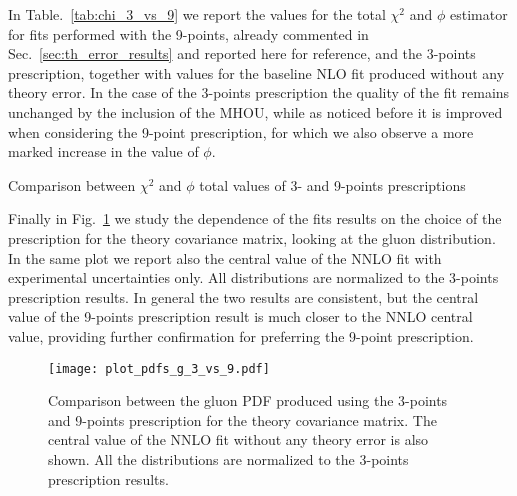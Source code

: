 In Table.~\ref{tab:chi_3_vs_9} we report the values for the total $\chi^2$ and $\phi$ estimator for fits performed with the 9-points,
already commented in Sec.~\ref{sec:th_error_results} and reported here for reference, and the 3-points
prescription, together with values for the baseline NLO fit produced without any theory error.
In the case of the 3-points prescription the quality of the fit remains unchanged by the inclusion of the MHOU,
while as noticed before it is improved when considering the 9-point prescription, for which we also observe a more 
marked increase in the value of $\phi$.

\begin{table}[ht!]
	\centering
	\small
	
        \vspace{3mm}
	\caption{Comparison between $\chi^2$ and $\phi$ total values of 3- and 9-points prescriptions}
	\label{tab:chi_3_vs_9}
\end{table}

Finally in Fig.~\ref{fig:pdfs_plots_th_err_3_vs_9} we study the dependence of the fits results on the choice of the prescription
for the theory covariance matrix, looking at the gluon distribution. In the same plot we report also the central value of
the NNLO fit with experimental uncertainties only. All distributions are normalized to the 3-points prescription results.
In general the two results are consistent, but the central value of the 9-points prescription result is much closer 
to the NNLO central value, providing further confirmation for preferring the 9-point prescription.

\begin{figure}[t!]
    \begin{center}
        \texttt{[image: plot\_pdfs\_g\_3\_vs\_9.pdf]}
        \caption{Comparison between the gluon PDF produced using the 3-points and 9-points prescription
        for the theory covariance matrix. The central value of the NNLO fit without any theory error is also shown.
        All the distributions are normalized to the 3-points prescription results.} 
        \label{fig:pdfs_plots_th_err_3_vs_9} 
    \end{center}
\end{figure}